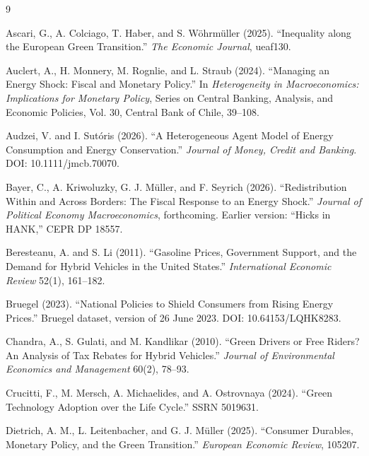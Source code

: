 \begin{thebibliography}{9}

Ascari, G., A. Colciago, T. Haber, and S. W\"ohrm\"uller (2025).
``Inequality along the European Green Transition.''
\emph{The Economic Journal}, ueaf130.

Auclert, A., H. Monnery, M. Rognlie, and L. Straub (2024).
``Managing an Energy Shock: Fiscal and Monetary Policy.''
In \emph{Heterogeneity in Macroeconomics: Implications for Monetary Policy},
Series on Central Banking, Analysis, and Economic Policies, Vol. 30,
Central Bank of Chile, 39--108.

Audzei, V. and I. Sut\'oris (2026).
``A Heterogeneous Agent Model of Energy Consumption and Energy Conservation.''
\emph{Journal of Money, Credit and Banking}. DOI: 10.1111/jmcb.70070.

Bayer, C., A. Kriwoluzky, G. J. M\"uller, and F. Seyrich (2026).
``Redistribution Within and Across Borders: The Fiscal Response to an Energy
Shock.'' \emph{Journal of Political Economy Macroeconomics}, forthcoming.
Earlier version: ``Hicks in HANK,'' CEPR DP 18557.

Beresteanu, A. and S. Li (2011).
``Gasoline Prices, Government Support, and the Demand for Hybrid Vehicles in the United States.''
\emph{International Economic Review} 52(1), 161--182.

Bruegel (2023).
``National Policies to Shield Consumers from Rising Energy Prices.''
Bruegel dataset, version of 26 June 2023. DOI: 10.64153/LQHK8283.

Chandra, A., S. Gulati, and M. Kandlikar (2010).
``Green Drivers or Free Riders? An Analysis of Tax Rebates for Hybrid Vehicles.''
\emph{Journal of Environmental Economics and Management} 60(2), 78--93.

Crucitti, F., M. Mersch, A. Michaelides, and A. Ostrovnaya (2024).
``Green Technology Adoption over the Life Cycle.'' SSRN 5019631.

Dietrich, A. M., L. Leitenbacher, and G. J. M\"uller (2025).
``Consumer Durables, Monetary Policy, and the Green Transition.''
\emph{European Economic Review}, 105207.


\end{thebibliography}
